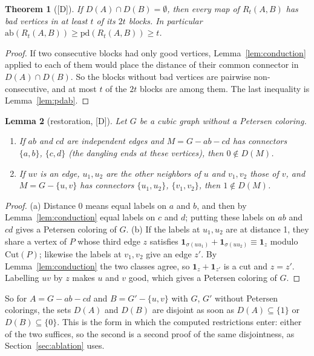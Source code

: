 \documentclass[11pt]{article}
\newtheorem{theorem}{Theorem}[section]
\newtheorem{lemma}[theorem]{Lemma}
\theoremstyle{definition}
\theoremstyle{remark}
\newcommand{\PG}{P}
\newcommand{\pd}{\mathrm{pd}}
\newcommand{\ab}{\mathrm{ab}}
\newcommand{\Cut}{\mathrm{Cut}}
\newcommand{\claim}[1]{\textup{[#1]}}
\begin{document}
\begin{theorem}[\claim{D}]\label{thm:ring}
If $D(A) \cap D(B) = \emptyset$, then every map of $R_t(A, B)$ has bad vertices in at least $t$ of
its $2t$ blocks. In particular $\ab(R_t(A, B)) \ge \pd(R_t(A, B)) \ge t$.
\end{theorem}

\begin{proof}
If two consecutive blocks had only good vertices, Lemma~\ref{lem:conduction} applied to each of
them would place the distance of their common connector in $D(A) \cap D(B)$. So the blocks without
bad vertices are pairwise non-consecutive, and at most $t$ of the $2t$ blocks are among them. The
last inequality is Lemma~\ref{lem:pdab}.
\end{proof}

\begin{lemma}[restoration, \claim{D}]\label{lem:restore}
Let $G$ be a cubic graph without a Petersen coloring.
\begin{enumerate}
\item[\textup{(a)}] If $ab$ and $cd$ are independent edges and $M = G - ab - cd$ has connectors
$\{a, b\}$, $\{c, d\}$ (the dangling ends at these vertices), then $0 \notin D(M)$.
\item[\textup{(b)}] If $uv$ is an edge, $u_1, u_2$ are the other neighbors of $u$ and $v_1, v_2$ those of
$v$, and $M = G - \{u, v\}$ has connectors $\{u_1, u_2\}$, $\{v_1, v_2\}$, then $1 \notin D(M)$.
\end{enumerate}
\end{lemma}

\begin{proof}
(a) Distance 0 means equal labels on $a$ and $b$, and then by Lemma~\ref{lem:conduction} equal labels
on $c$ and $d$; putting these labels on $ab$ and $cd$ gives a Petersen coloring of $G$. (b) If
the labels at $u_1, u_2$ are at distance 1, they share a vertex of $\PG$ whose third edge $z$
satisfies $\mathbf{1}_{\sigma(uu_1)} + \mathbf{1}_{\sigma(uu_2)} \equiv \mathbf{1}_z$ modulo
$\Cut(\PG)$; likewise the labels at $v_1, v_2$ give an edge $z'$. By Lemma~\ref{lem:conduction} the
two classes agree, so $\mathbf{1}_z + \mathbf{1}_{z'}$ is a cut and $z = z'$. Labelling $uv$ by $z$
makes $u$ and $v$ good, which gives a Petersen coloring of $G$.
\end{proof}

So for $A = G - ab - cd$ and $B = G' - \{u, v\}$ with $G$, $G'$ without Petersen colorings, the sets
$D(A)$ and $D(B)$ are disjoint as soon as $D(A) \subseteq \{1\}$ or $D(B) \subseteq \{0\}$. This is the
form in which the computed restrictions enter: either of the two suffices, so the second is a second
proof of the same disjointness, as Section~\ref{sec:ablation} uses.
\end{document}
